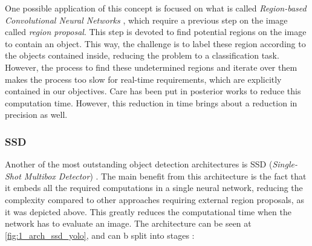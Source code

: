One possible application of this concept is focused on what is called \textit{Region-based Convolutional Neural Networks} \cite{rcnn}, which require a previous step on the image called \textit{region proposal}. This step is devoted to find potential regions on the image to contain an object. This way, the challenge is to label these region according to the objects contained inside, reducing the problem to a classification task. However, the process to find these undetermined regions and iterate over them makes the process too slow for real-time requirements, which are explicitly contained in our objectives. Care has been put in posterior works \cite{fastrcnn} \cite{spp} to reduce this computation time. However, this reduction in time brings about a reduction in precision as well.\\

\subsubsection{SSD}

Another of the most outstanding object detection architectures is SSD (\textit{Single-Shot Multibox Detector}) \cite{ssd}. The main benefit from this architecture is the fact that it embeds all the required computations in a single neural network, reducing the complexity compared to other approaches requiring external region proposals, as it was depicted above. This greatly reduces the computational time when the network has to evaluate an image. The architecture can be seen at \autoref{fig:1_arch_ssd_yolo}, and can b split into stages \cite{tfg}:

